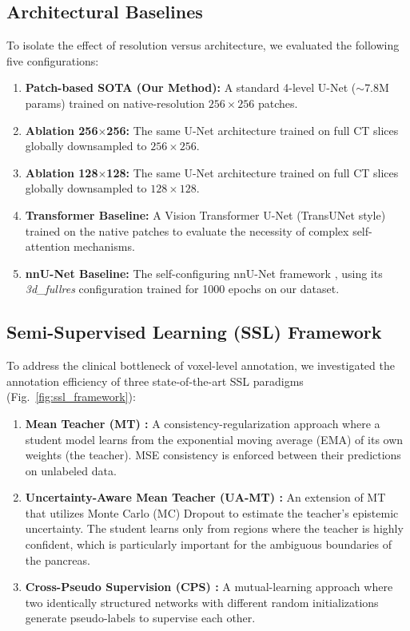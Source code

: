 \documentclass[journal, twocolumn]{IEEEtran}
\begin{document}
\subsection{Architectural Baselines}
To isolate the effect of resolution versus architecture, we evaluated the following five configurations:
\begin{enumerate}
    \item \textbf{Patch-based SOTA (Our Method):} A standard 4-level U-Net ($\sim$7.8M params) trained on native-resolution $256 \times 256$ patches.
    \item \textbf{Ablation 256$\times$256:} The same U-Net architecture trained on full CT slices globally downsampled to $256 \times 256$.
    \item \textbf{Ablation 128$\times$128:} The same U-Net architecture trained on full CT slices globally downsampled to $128 \times 128$.
    \item \textbf{Transformer Baseline:} A Vision Transformer U-Net (TransUNet style) \cite{transunet} trained on the native patches to evaluate the necessity of complex self-attention mechanisms.
    \item \textbf{nnU-Net Baseline:} The self-configuring nnU-Net framework \cite{nnunet}, using its \textit{3d\_fullres} configuration trained for 1000 epochs on our dataset.
\end{enumerate}

\subsection{Semi-Supervised Learning (SSL) Framework}
To address the clinical bottleneck of voxel-level annotation, we investigated the annotation efficiency of three state-of-the-art SSL paradigms (Fig.~\ref{fig:ssl_framework}):
\begin{enumerate}
    \item \textbf{Mean Teacher (MT) \cite{tarvainen2017mean}:} A consistency-regularization approach where a student model learns from the exponential moving average (EMA) of its own weights (the teacher). MSE consistency is enforced between their predictions on unlabeled data.
    \item \textbf{Uncertainty-Aware Mean Teacher (UA-MT) \cite{uamt}:} An extension of MT that utilizes Monte Carlo (MC) Dropout to estimate the teacher's epistemic uncertainty. The student learns only from regions where the teacher is highly confident, which is particularly important for the ambiguous boundaries of the pancreas.
    \item \textbf{Cross-Pseudo Supervision (CPS) \cite{cps}:} A mutual-learning approach where two identically structured networks with different random initializations generate pseudo-labels to supervise each other.
\end{enumerate}
\end{document}
